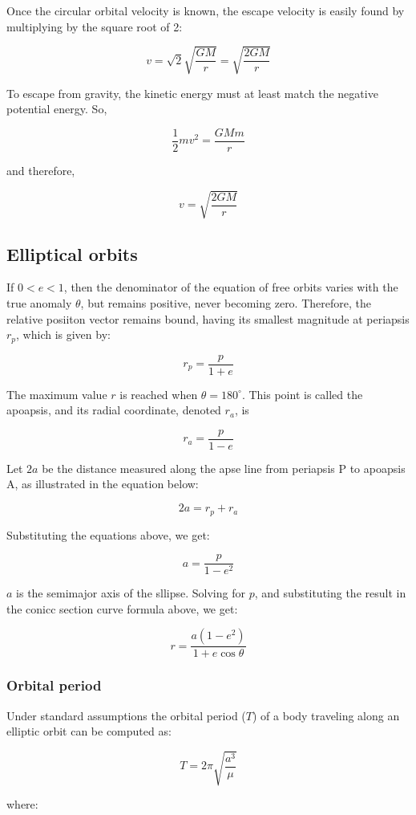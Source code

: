 \documentclass[12pt]{article}
\begin{document}
Once the circular orbital velocity is known, the escape velocity is easily found by multiplying by the square root of 2:

\[v=\sqrt{2}\sqrt{\frac{GM}{r}}=\sqrt{\frac{2GM}{r}}\]

To escape from gravity, the kinetic energy must at least match the negative potential energy. So,

\[\frac{1}{2}mv^{2}=\frac{GMm}{r}\]

and therefore,

\[v=\sqrt{\frac{2GM}{r}}\]

\subsection{Elliptical orbits}

If \(0<e<1\), then the denominator of the equation of free orbits varies with the true anomaly \(\theta\), but remains positive, never becoming zero. Therefore, the relative posiiton vector remains bound, having its smallest magnitude at periapsis \(r_{p}\), which is given by:

\[r_{p}=\frac{p}{1+e}\]

The maximum value \(r\) is reached when \(\theta=180^{\circ}\). This point is called the apoapsis, and its radial coordinate, denoted \(r_{a}\), is

\[r_{a}=\frac{p}{1-e}\]

Let \(2a\) be the distance measured along the apse line from periapsis P to apoapsis A, as illustrated in the equation below:

\[2a=r_p+r_a\]

Substituting the equations above, we get:

\[a=\frac{p}{1-e^2}\]

\(a\) is the semimajor axis of the sllipse. Solving for \(p\), and substituting the result in the conicc section curve formula above, we get:

\[r=\frac{a(1-e^2)}{1+e\cos\theta}\]

\subsubsection{Orbital period}

Under standard assumptions the orbital period (\(T\)) of a body traveling along an elliptic orbit can be computed as:

\[T=2\pi\sqrt{\frac{a^3}{\mu}}\]

where:
\end{document}
